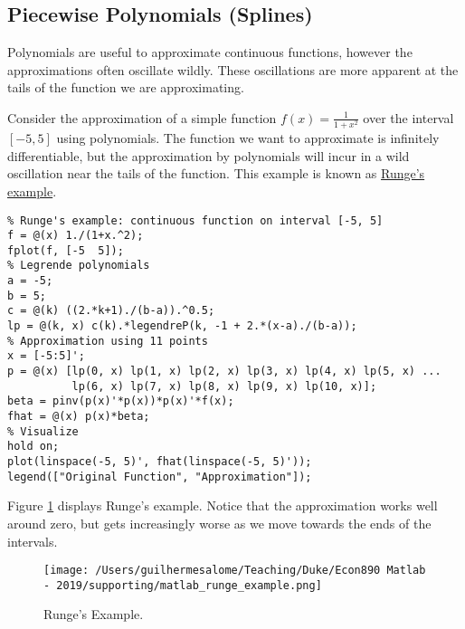 \documentclass[12pt, a4paper]{article}
\begin{document}
\subsection{Piecewise Polynomials (Splines)}
\label{sec:org1d53b1f}
Polynomials are useful to approximate continuous functions, however the approximations often oscillate wildly.
These oscillations are more apparent at the tails of the function we are approximating.

Consider the approximation of a simple function \(f(x)=\frac{1}{1+x^2}\) over the interval \([-5, 5]\) using polynomials.
The function we want to approximate is infinitely differentiable, but the approximation by polynomials will incur in a wild oscillation near the tails of the function.
This example is known as \href{https://en.wikipedia.org/wiki/Runge\%27s\_phenomenon}{Runge's example}.
\lstset{language=matlab,label= ,caption= ,captionpos=b,firstnumber=1,numbers=left,style=Matlab-editor}
\begin{lstlisting}
% Runge's example: continuous function on interval [-5, 5]
f = @(x) 1./(1+x.^2);
fplot(f, [-5  5]);
% Legrende polynomials
a = -5;
b = 5;
c = @(k) ((2.*k+1)./(b-a)).^0.5;
lp = @(k, x) c(k).*legendreP(k, -1 + 2.*(x-a)./(b-a));
% Approximation using 11 points
x = [-5:5]';
p = @(x) [lp(0, x) lp(1, x) lp(2, x) lp(3, x) lp(4, x) lp(5, x) ...
          lp(6, x) lp(7, x) lp(8, x) lp(9, x) lp(10, x)];
beta = pinv(p(x)'*p(x))*p(x)'*f(x);
fhat = @(x) p(x)*beta;
% Visualize
hold on;
plot(linspace(-5, 5)', fhat(linspace(-5, 5)'));
legend(["Original Function", "Approximation"]);
\end{lstlisting}

Figure \ref{fig:orge3072c0} displays Runge's example.
Notice that the approximation works well around zero, but gets increasingly worse as we move towards the ends of the intervals.
\begin{figure}[H]
\centering
\texttt{[image: /Users/guilhermesalome/Teaching/Duke/Econ890 Matlab - 2019/supporting/matlab\_runge\_example.png]}
\caption{\label{fig:orge3072c0}
Runge's Example.}
\end{figure}
\end{document}
